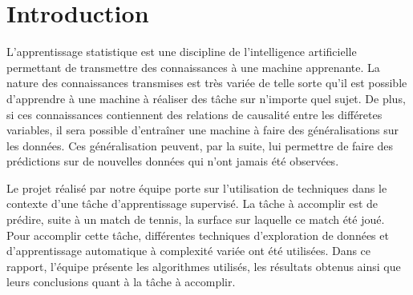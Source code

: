 \section{Introduction}

L'apprentissage statistique est une discipline de l'intelligence artificielle permettant de transmettre des connaissances à une machine apprenante. La nature des connaissances transmises est très variée de telle sorte qu'il est possible d'apprendre à une machine à réaliser des tâche sur n'importe quel sujet. De plus, si ces connaissances contiennent des relations de causalité entre les différetes variables, il sera possible d'entraîner une machine à faire des généralisations sur les données. Ces généralisation peuvent, par la suite, lui permettre de faire des prédictions sur de nouvelles données qui n'ont jamais été observées.

Le projet réalisé par notre équipe porte sur l'utilisation de techniques dans le contexte d'une tâche d'apprentissage supervisé. La tâche à accomplir est de prédire, suite à un match de tennis, la surface sur laquelle ce match été joué.  Pour accomplir cette tâche, différentes techniques d'exploration de données et d'apprentissage automatique à complexité variée ont été utilisées.  Dans ce rapport, l'équipe présente les algorithmes utilisés, les résultats obtenus ainsi que leurs conclusions quant à la tâche à accomplir.

